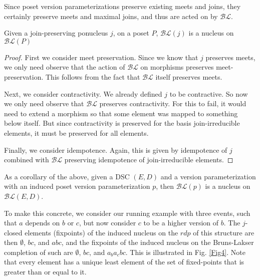 \documentclass[a4paper,USenglish,cleveref, autoref, thm-restate,authorcolumns]{lipics-v2019}
\newcommand{\BLc}{\mathcal{BL}}
\begin{document}
Since poset version parameterizations preserve existing meets and joins, they certainly preserve meets and maximal joins, and thus are acted on by \(\BLc\).

\begin{theorem}
Given a join-preserving ponucleus \(j\), on a poset \(P\),  \(\BLc(j)\) is a nucleus on \(\BLc(P)\)
\end{theorem}
\begin{proof}
First we consider meet preservation. Since we know that \(j\) preserves meets, we only need observe that the action of \(\BLc\) on morphisms preserves meet-preservation. This follows from the fact that \(\BLc\) itself preserves meets.

Next, we consider contractivity. We already defined \(j\) to be contractive. So now we only need observe that \(\BLc\) preserves contractivity. For this to fail, it would need to extend a morphism so that some element was mapped to something below itself. But since contractivity is preserved for the basis join-irreducible elements, it must be preserved for all elements.

Finally, we consider idempotence. Again, this is given by idempotence of \(j\) combined with \(\BLc\) preserving idempotence of join-irreducible elements.
\end{proof}

As a corollary of the above, given a DSC \((E,D)\) and a version parameterization with an induced poset version parameterization \(p\), then \(\BLc(p)\) is a nucleus on \(\BLc(E,D)\).

To make this concrete, we consider our running example with three events, such that \(a\) depends on \(b\) or \(c\), but now consider \(c\) to be a higher version of \(b\). The \(j\)-closed elements (fixpoints) of the induced nucleus on the \(rdp\) of this structure are then \(\emptyset\), \(bc\), and \(abc\), and the fixpoints of the induced nucleus on the Bruns-Lakser completion of such are \(\emptyset\), \(bc\), and \(a_ba_cbc\). This is illustrated in Fig. \ref{Fig4}. Note that every element has a unique least element of the set of fixed-points that is greater than or equal to it.
\end{document}

